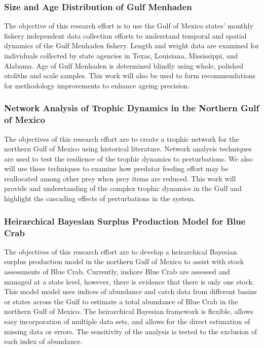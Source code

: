 \documentclass[]{article}
\begin{document}
\hypertarget{size-and-age-distribution-of-gulf-menhaden}{%
\subsubsection{Size and Age Distribution of Gulf
Menhaden}\label{size-and-age-distribution-of-gulf-menhaden}}

The objective of this research effort is to use the Gulf of Mexico
states' monthly fishery independent data collection efforts to
understand temporal and spatial dynamics of the Gulf Menhaden fishery.
Length and weight data are examined for individuals collected by state
agencies in Texas, Louisiana, Mississippi, and Alabama. Age of Gulf
Menhaden is determined blindly using whole, polished otoliths and scale
samples. This work will also be used to form recommendations for
methodology improvements to enhance ageing precision.

\hypertarget{network-analysis-of-trophic-dynamics-in-the-northern-gulf-of-mexico}{%
\subsubsection{Network Analysis of Trophic Dynamics in the Northern Gulf
of
Mexico}\label{network-analysis-of-trophic-dynamics-in-the-northern-gulf-of-mexico}}

The objectives of this research effort are to create a trophic network
for the northern Gulf of Mexico using historical literature. Network
analysis techniques are used to test the resilience of the trophic
dynamics to perturbations. We also will use these techniques to examine
how predator feeding effort may be reallocated among other prey when
prey items are reduced. This work will provide and understanding of the
complex trophic dynamics in the Gulf and highlight the cascading effects
of perturbations in the system.

\hypertarget{heirarchical-bayesian-surplus-production-model-for-blue-crab}{%
\subsubsection{Heirarchical Bayesian Surplus Production Model for Blue
Crab}\label{heirarchical-bayesian-surplus-production-model-for-blue-crab}}

The objectives of this research effort are to develop a heirarchical
Bayesian surplus production model in the northern Gulf of Mexico to
assist with stock assessments of Blue Crab. Currently, inshore Blue Crab
are assessed and managed at a state level, however, there is evidence
that there is only one stock. This model model uses indices of abundance
and catch data from different basins or states across the Gulf to
estimate a total abundance of Blue Crab in the northern Gulf of Mexico.
The heirarchical Bayesian framework is flexible, allows easy
incorporation of multiple data sets, and allows for the direct
estimation of missing data or errors. The sensitivity of the analysis is
tested to the exclusion of each index of abundance.
\end{document}
